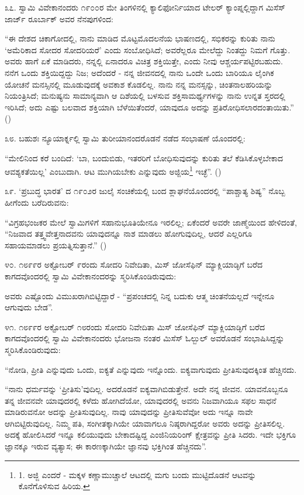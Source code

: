 ೩೭. ಸ್ವಾಮಿ ವಿವೇಕಾನಂದರು ೧೯೦೦ರ ಮೇ ತಿಂಗಳಿನಲ್ಲಿ ಕ್ಯಾಲಿಫೋರ್ನಿಯಾದ ಟೇಲರ್ ಕ್ಯಾಂಪ್ನಲ್ಲಿದ್ದಾಗ ಮಿಸೆಸ್ ಜಾರ್ಜ್ ರೂರ್ಬಾಕ್ ಅವರ ನೆನಪುಗಳಿಂದ:

“ಈ ದೇಶದ ಚಿಕಾಗೋದಲ್ಲಿ, ನಾನು ಮಾಡಿದ ಮೊಟ್ಟಮೊದಲನೆಯ ಭಾಷಣದಲ್ಲಿ, ಸಭಿಕರನ್ನು ಕುರಿತು ನಾನು ‘ಅಮೆರಿಕಾದ ಸೋದರ ಸೋದರಿಯರೆ’ ಎಂದು ಸಂಬೋಧಿಸಿದೆ; ಅವರೆಲ್ಲರೂ ಮೇಲೆದ್ದು ನಿಂತದ್ದು ನಿಮಗೆ ಗೊತ್ತು. ಅವರು ಹಾಗೆ ಏಕೆ ಮಾಡಿದರು, ನನ್ನಲ್ಲಿ ಏನಾದರೂ ವಿಚಿತ್ರ ಶಕ್ತಿಯಿತ್ತೇ, ಎಂದು ನೀವು ಆಶ್ಚರ್ಯಪಟ್ಟಿರಬಹುದು. ನನೆಗ ಒಂದು ಶಕ್ತಿಯಿದ್ದದ್ದು ನಿಜ; ಅದೆಂದರೆ - ನನ್ನ ಜೀವನದಲ್ಲಿ ನಾನು ಒಂದೇ ಒಂದು ಬಾರಿಯೂ ಲೈಂಗಿಕ ಯೋಚನೆ ಮನಸ್ಸಿನಲ್ಲಿ ಮೂಡುವುದಕ್ಕೆ ಅವಕಾಶ ಕೊಡಲಿಲ್ಲ. ನಾನು ನನ್ನ ಮನಸ್ಸನ್ನು, ಚಿಂತನಾಲಹರಿಯನ್ನು ನಿಯಂತ್ರಿಸಿದೆ; ಮನುಷ್ಯನು ಸಾಮಾನ್ಯವಾಗಿ ಆ ದಿಶೆಯಲ್ಲಿ ಬಳಸುವ ಶಕ್ತಿಸಾಮರ್ಥ್ಯಗಳನ್ನು ನಾನು ಉನ್ನತ ಸ್ತರದಲ್ಲಿ ಇರಿಸಿದೆ; ಅದು ಎಷ್ಟು ಬಲವಾದ ಶಕ್ತಿಯಾಗಿ ಬೆಳೆಯಿತೆಂದರೆ, ಯಾವುದೂ ಅದನ್ನು ಪ್ರತಿರೋಧಿಸಲಾರದಂತಾಯಿತು.” ()

೩೮. ಬಹುಶಃ ನ್ಯೂಯಾರ್ಕ್ನಲ್ಲಿ ಸ್ವಾಮಿ ತುರೀಯಾನಂದರೊಡನೆ ನಡೆದ ಸಂಭಾಷಣೆ ಯೊಂದರಲ್ಲಿ:

“ಮೇಲಿನಿಂದ ಕರೆ ಬಂದಿದೆ: ‘ಬಾ, ಬಂದುಬಿಡು, ಇತರರಿಗೆ ಬೋಧಿಸುವುದನ್ನು ಕುರಿತು ತಲೆ ಕೆಡಿಸಿಕೊಳ್ಳಬೇಕಾದ ಆವಶ್ಯಕತೆಯಿಲ್ಲ’ ಎಂಬುದಾಗಿ. ಆಟ ಮುಗಿಯಬೇಕು ಎನ್ನುವುದು ಅಜ್ಜಿಯ\footnote{1. ಅಜ್ಜಿ ಎಂದರೆ - ಮಕ್ಕಳ ಕಣ್ಣಾಮುಚ್ಚಾಲೆ ಆಟದಲ್ಲಿ ಮಗು ಬಂದು ಮುಟ್ಟಿದೊಡನೆ ಆಟವನ್ನು ಕೊನೆಗೊಳಿಸುವ ಹಿರಿಯ.} ಇಚ್ಛೆ”. ()

೩೯. ‘ಪ್ರಬುದ್ಧ ಭಾರತ’ ದ ೧೯೦೨ರ ಜುಲೈ ಸಂಚಿಕೆಯಲ್ಲಿ ಬಂದ ಶ್ಲಾಘನೆಯೊಂದರಲ್ಲಿ “ಪಾಶ್ಚಾತ್ಯ ಶಿಷ್ಯ” ನೊಬ್ಬ ಹೀಗೆಂದು ಬರೆದಿರುವನು:

“ವಿಗ್ರಹಭಂಜಕರ ಮೇಲೆ ಸ್ವಾಮಿಗಳಿಗೆ ಸಹಾನುಭೂತಿಯೇನೂ ಇರಲಿಲ್ಲ; ಏಕೆಂದರೆ ಅವರೇ ಜಾಣ್ಮೆಯಿಂದ ಹೇಳಿದಂತೆ, “ನಿಜವಾದ ತತ್ತ್ವವೇತ್ತನಾದವನು ಯಾವುದನ್ನೂ ನಾಶ ಮಾಡಲು ಹೋಗುವುದಿಲ್ಲ, ಆದರೆ ಎಲ್ಲರಿಗೂ ಸಹಾಯಮಾಡಲು ಪ್ರಯತ್ನಿಸುತ್ತಾನೆ.” ()

೪೦. ೧೮೯೯ರ ಅಕ್ಟೋಬರ್ ೯ರಂದು ಸೋದರಿ ನಿವೇದಿತಾ, ಮಿಸ್ ಜೋಸೆಫಿನ್ ಮ್ಯಾಕ್ಲಿಯಾಡ್ಳಿಗೆ ಬರೆದ ಕಾಗದವೊಂದರಲ್ಲಿ ಸ್ವಾಮಿ ವಿವೇಕಾನಂದರನ್ನು ಸ್ಮರಿಸಿಕೊಂಡಿರುವುದು:

ಅವರು ಎಷ್ಟೊಂದು ವಿಮುಖರಾಗಿಬಿಟ್ಟಿದ್ದಾರೆ - “ಪ್ರಪಂಚದಲ್ಲಿ ನಿನ್ನ ಬದುಕು ಆತ್ಮ ಚಿಂತನೆಯಲ್ಲದೆ ಇನ್ನೇನೂ ಆಗುವುದು ಬೇಡ”. 

೪೧. ೧೮೯೯ರ ಅಕ್ಟೋಬರ್ ೧೮ರಂದು ಸೋದರಿ ನಿವೇದಿತಾ ಮಿಸ್ ಜೋಸೆಫಿನ್ ಮ್ಯಾಕ್ಲಿಯಾಡ್ಳಿಗೆ ಬರೆದ ಕಾಗದವೊಂದರಲ್ಲಿ ಸ್ವಾಮಿ ವಿವೇಕಾನಂದರು ಭೋಜನಾ ನಂತರ ಮಿಸೆಸ್ ಓಲ್ಬುಲ್ ಅವರೊಡನೆ ಸಂಭಾಷಿಸಿದ್ದನ್ನು ಸ್ಮರಿಸಿಕೊಂಡಿರುವುದು:

“ನೋಡಿ, ಪ್ರೀತಿ ಎನ್ನುವುದು ಒಂದು, ಐಕ್ಯತೆ ಎನ್ನುವುದು ಇನ್ನೊಂದು. ಐಕ್ಯವಾಗುವುದು ಪ್ರೀತಿಸುವುದಕ್ಕಿಂತ ಹೆಚ್ಚಿನದು.

“ನಾನು ಧರ್ಮವನ್ನು ‘ಪ್ರೀತಿಸು’ವುದಿಲ್ಲ. ಅದರೊಡನೆ ಐಕ್ಯವಾಗಿಬಿಡುತ್ತೇನೆ. ಅದೇ ನನ್ನ ಜೀವನ. ಯಾವನೊಬ್ಬನೂ ತನ್ನ ಜೀವನವೇ ಯಾವುದರಲ್ಲಿ ಕಳೆದು ಹೋಗಿದೆಯೋ, ಯಾವುದರಲ್ಲಿ ಅವನು ನಿಜವಾಗಿಯೂ ಸಫಲ ಸಾಧನೆ ಮಾಡಿರುವನೋ ಅದನ್ನು ಪ್ರೀತಿಸುವುದಿಲ್ಲ. ನಾವು ಯಾವುದನ್ನು ಪ್ರೀತಿಸುವೆವೋ ಅದು ಇನ್ನೂ ನಾವೇ ಆಗಿಬಿಟ್ಟಿರುವುದಿಲ್ಲ. ನಿಮ್ಮ ಪತಿ, ಸಂಗೀತಕ್ಕಾಗಿಯೇ ಯಾವಾಗಲೂ ನಿಷ್ಠರಾಗಿದ್ದರೋ ಅವರು ಅದನ್ನು ಪ್ರೀತಿಸಲಿಲ್ಲ. ಅದಕ್ಕೆ ಹೋಲಿಸಿದರೆ ಇನ್ನೂ ಕಲಿಯುವುದು ಬೇಕಾದಷ್ಟಿದ್ದ ಎಂಜಿನಿಯರಿಂಗ್ ಕ್ಷೇತ್ರವನ್ನು ಪ್ರೀತಿ ಸಿದರು. ಇದೇ ಭಕ್ತಿಗೂ ಜ್ಞಾನಕ್ಕೂ ಇರುವ ವ್ಯತ್ಯಾಸ; ಈ ಕಾರಣಕ್ಕಾಗಿಯೇ ಜ್ಞಾನವು ಭಕ್ತಿಗಿಂತ ಹೆಚ್ಚಿನದು”. 


